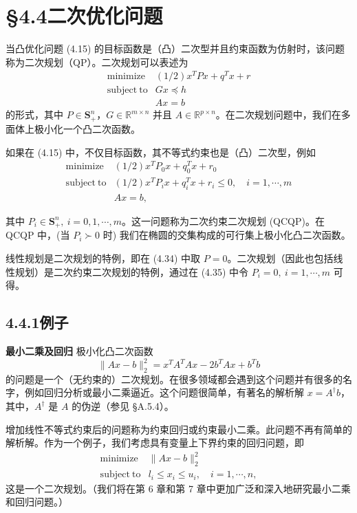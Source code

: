 \documentclass[UTF8,12pt,a4paper,fontset=fandol]{ctexart}
\begin{document}
\section*{§4.4\quad 二次优化问题}

当凸优化问题 (4.15) 的目标函数是（凸）二次型并且约束函数为仿射时，该问题称为二次规划（QP）。二次规划可以表述为
\begin{equation}
\begin{array}{ll}
\mathop{\mathrm{minimize}} & (1/2)x^TPx+q^Tx+r\\
\mathrm{subject\ to} & Gx\preceq h\\
& Ax=b
\end{array}
\tag{4.34}
\end{equation}
的形式，其中 $P\in\mathbf{S}_+^n$，$G\in\mathbb{R}^{m\times n}$ 并且 $A\in\mathbb{R}^{p\times n}$。在二次规划问题中，我们在多面体上极小化一个凸二次函数。

如果在 (4.15) 中，不仅目标函数，其不等式约束也是（凸）二次型，例如
\begin{equation}
\begin{array}{ll}
\mathop{\mathrm{minimize}} & (1/2)x^TP_0x+q_0^Tx+r_0\\
\mathrm{subject\ to} & (1/2)x^TP_ix+q_i^Tx+r_i\leq 0,\quad i=1,\cdots,m\\
& Ax=b,
\end{array}
\tag{4.35}
\end{equation}

其中 $P_i\in \mathbf{S}_+^n,\ i=0,1,\cdots,m$。这一问题称为二次约束二次规划 (QCQP)。在 QCQP 中，(当 $P_i\succ 0$ 时) 我们在椭圆的交集构成的可行集上极小化凸二次函数。

线性规划是二次规划的特例，即在 (4.34) 中取 $P=0$。二次规划（因此也包括线性规划）是二次约束二次规划的特例，通过在 (4.35) 中令 $P_i=0,\ i=1,\cdots,m$ 可得。

\subsection*{4.4.1\quad 例子}

\noindent\textbf{最小二乘及回归}\quad
极小化凸二次函数
\[
\|Ax-b\|_2^2=x^TA^TAx-2b^TAx+b^Tb
\]
的问题是一个（无约束的）二次规划。在很多领域都会遇到这个问题并有很多的名字，例如回归分析或最小二乘逼近。这个问题很简单，有著名的解析解 $x=A^\dagger b$，其中，$A^\dagger$ 是 $A$ 的伪逆（参见 \S A.5.4）。

增加线性不等式约束后的问题称为约束回归或约束最小二乘。此问题不再有简单的解析解。作为一个例子，我们考虑具有变量上下界约束的回归问题，即
\[
\begin{array}{ll}
\mathop{\mathrm{minimize}} & \|Ax-b\|_2^2\\
\mathrm{subject\ to} & l_i\leq x_i\leq u_i,\quad i=1,\cdots,n,
\end{array}
\]
这是一个二次规划。（我们将在第 6 章和第 7 章中更加广泛和深入地研究最小二乘和回归问题。）
\end{document}
